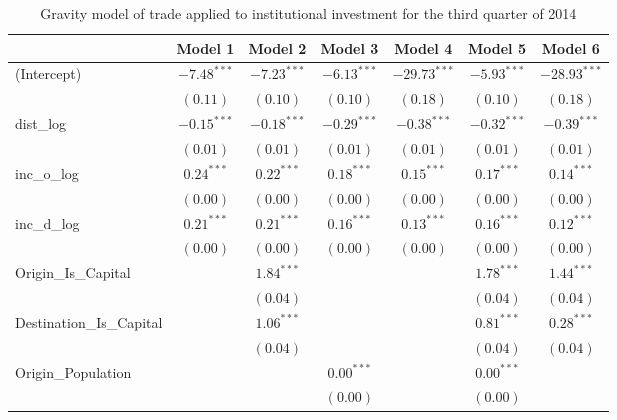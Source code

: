 \begin{table}
	\small
	\caption[Gravity Model of Trade for Q3 2014]{Gravity model of trade applied to institutional investment for the third quarter of 2014}
	\begin{center}
		\begin{tabular}{l c c c c c c }
			\hline
			& Model 1 & Model 2 & Model 3 & Model 4 & Model 5 & Model 6 \\
			\hline
			(Intercept)                  & $-7.48^{***}$ & $-7.23^{***}$ & $-6.13^{***}$ & $-29.73^{***}$ & $-5.93^{***}$ & $-28.93^{***}$ \\
			& $(0.11)$      & $(0.10)$      & $(0.10)$      & $(0.18)$       & $(0.10)$      & $(0.18)$       \\
			dist\_log                    & $-0.15^{***}$ & $-0.18^{***}$ & $-0.29^{***}$ & $-0.38^{***}$  & $-0.32^{***}$ & $-0.39^{***}$  \\
			& $(0.01)$      & $(0.01)$      & $(0.01)$      & $(0.01)$       & $(0.01)$      & $(0.01)$       \\
			inc\_o\_log                  & $0.24^{***}$  & $0.22^{***}$  & $0.18^{***}$  & $0.15^{***}$   & $0.17^{***}$  & $0.14^{***}$   \\
			& $(0.00)$      & $(0.00)$      & $(0.00)$      & $(0.00)$       & $(0.00)$      & $(0.00)$       \\
			inc\_d\_log                  & $0.21^{***}$  & $0.21^{***}$  & $0.16^{***}$  & $0.13^{***}$   & $0.16^{***}$  & $0.12^{***}$   \\
			& $(0.00)$      & $(0.00)$      & $(0.00)$      & $(0.00)$       & $(0.00)$      & $(0.00)$       \\
			Origin\_Is\_Capital          &               & $1.84^{***}$  &               &                & $1.78^{***}$  & $1.44^{***}$   \\
			&               & $(0.04)$      &               &                & $(0.04)$      & $(0.04)$       \\
			Destination\_Is\_Capital     &               & $1.06^{***}$  &               &                & $0.81^{***}$  & $0.28^{***}$   \\
			&               & $(0.04)$      &               &                & $(0.04)$      & $(0.04)$       \\
			Origin\_Population           &               &               & $0.00^{***}$  &                & $0.00^{***}$  &                \\
			&               &               & $(0.00)$      &                & $(0.00)$      &                \\

\end{tabular}
\end{center}
\end{table}
